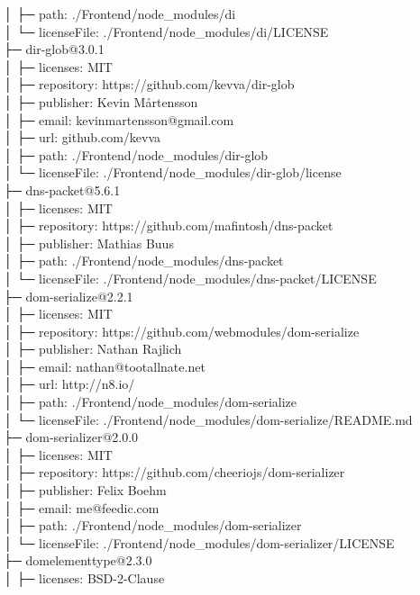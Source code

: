 │  ├─ path: ./Frontend/node\_modules/di\\
│  └─ licenseFile: ./Frontend/node\_modules/di/LICENSE\\
├─ dir-glob@3.0.1\\
│  ├─ licenses: MIT\\
│  ├─ repository: https://github.com/kevva/dir-glob\\
│  ├─ publisher: Kevin Mårtensson\\
│  ├─ email: kevinmartensson@gmail.com\\
│  ├─ url: github.com/kevva\\
│  ├─ path: ./Frontend/node\_modules/dir-glob\\
│  └─ licenseFile: ./Frontend/node\_modules/dir-glob/license\\
├─ dns-packet@5.6.1\\
│  ├─ licenses: MIT\\
│  ├─ repository: https://github.com/mafintosh/dns-packet\\
│  ├─ publisher: Mathias Buus\\
│  ├─ path: ./Frontend/node\_modules/dns-packet\\
│  └─ licenseFile: ./Frontend/node\_modules/dns-packet/LICENSE\\
├─ dom-serialize@2.2.1\\
│  ├─ licenses: MIT\\
│  ├─ repository: https://github.com/webmodules/dom-serialize\\
│  ├─ publisher: Nathan Rajlich\\
│  ├─ email: nathan@tootallnate.net\\
│  ├─ url: http://n8.io/\\
│  ├─ path: ./Frontend/node\_modules/dom-serialize\\
│  └─ licenseFile: ./Frontend/node\_modules/dom-serialize/README.md\\
├─ dom-serializer@2.0.0\\
│  ├─ licenses: MIT\\
│  ├─ repository: https://github.com/cheeriojs/dom-serializer\\
│  ├─ publisher: Felix Boehm\\
│  ├─ email: me@feedic.com\\
│  ├─ path: ./Frontend/node\_modules/dom-serializer\\
│  └─ licenseFile: ./Frontend/node\_modules/dom-serializer/LICENSE\\
├─ domelementtype@2.3.0\\
│  ├─ licenses: BSD-2-Clause\\
